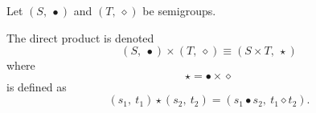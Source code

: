 Let $(S,\ \bullet)$ and $(T,\ \diamond)$ be semigroups.

The {direct product} is denoted 
\[ 
   (S,\ \bullet) \times (T,\ \diamond) \equiv (S \times T,\ \star)
\] 
where 
\[ 
\star = \bullet \times \diamond 
\] 
is defined as 
\[ 
	(s_1,\ t_1) \star (s_2,\ t_2) 
        = 
        (s_1 \bullet s_2,\  t_1 \diamond t_2).
\] 

